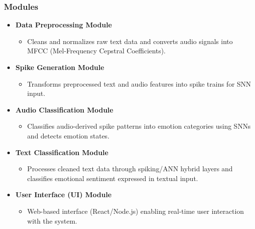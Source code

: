 \documentclass[aspectratio=169]{beamer}
\begin{document}
\begin{frame}
    \frametitle{Modules}
    \begin{itemize}
        \item \textbf{Data Preprocessing Module}
        \begin{itemize}
            \item Cleans and normalizes raw text data and converts audio signals into MFCC (Mel-Frequency Cepstral Coefficients).
        \end{itemize}
        \item \textbf{Spike Generation Module}
        \begin{itemize}
            \item Transforms preprocessed text and audio features into spike trains for SNN input.
        \end{itemize}
        \item \textbf{Audio Classification Module}
        \begin{itemize}
            \item Classifies audio-derived spike patterns into emotion categories using SNNs and detects emotion states.
        \end{itemize}
        \item \textbf{Text Classification Module}
        \begin{itemize}
            \item Processes cleaned text data through spiking/ANN hybrid layers and classifies emotional sentiment expressed in textual input.
        \end{itemize}
        \item \textbf{User Interface (UI) Module}
        \begin{itemize}
            \item Web-based interface (React/Node.js) enabling real-time user interaction with the system.
        \end{itemize}
    \end{itemize}
\end{frame}




\end{document}
